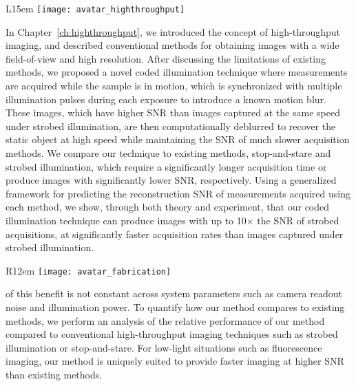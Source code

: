 \begin{wrapfigure}{L}{15em}
  \texttt{[image: avatar\_highthroughput]}
\end{wrapfigure}

In Chapter~\ref{ch:highthroughput}, we introduced the concept of high-throughput imaging, and described conventional methods for obtaining images with a wide field-of-view and high resolution. After discussing the limitations of existing methods, we proposed a novel coded illumination technique where measurements are acquired while the sample is in motion, which is synchronized with multiple illumination pulses during each exposure to introduce a known motion blur. These images, which have higher SNR than images captured at the same speed under strobed illumination, are then computationally deblurred to recover the static object at high speed while maintaining the SNR of much slower acquisition methods. We compare our technique to existing methods, stop-and-stare and strobed illumination, which require a significantly longer acquisition time or produce images with significantly lower SNR, respectively. Using a generalized framework for predicting the reconstruction SNR of measurements acquired using each method, we show, through both theory and experiment, that our coded illumination technique can produce images with up to 10$\times$ the SNR of strobed acquisitions, at significantly faster acquisition rates than images captured under strobed illumination.

\begin{wrapfigure}{R}{12em}
  \texttt{[image: avatar\_fabrication]}
\end{wrapfigure}

\noindent of this benefit is not constant across system parameters such as camera readout noise and illumination power. To quantify how our method compares to existing methods, we perform an analysis of the relative performance of our method compared to conventional high-throughput imaging techniques such as strobed illumination or stop-and-stare. For low-light situations such as fluorescence imaging, our method is uniquely suited to provide faster imaging at higher SNR than existing methods.


